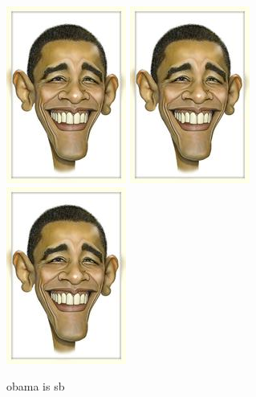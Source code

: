 \documentclass[12pt]{article}
\begin{document}
    \begin{figure}[htbp]
        \centering
        \includegraphics{obama.jpg}
        \includegraphics{obama.jpg}
        \includegraphics{obama.jpg}
        \caption{obama is sb}
    \end{figure}
\end{document}
